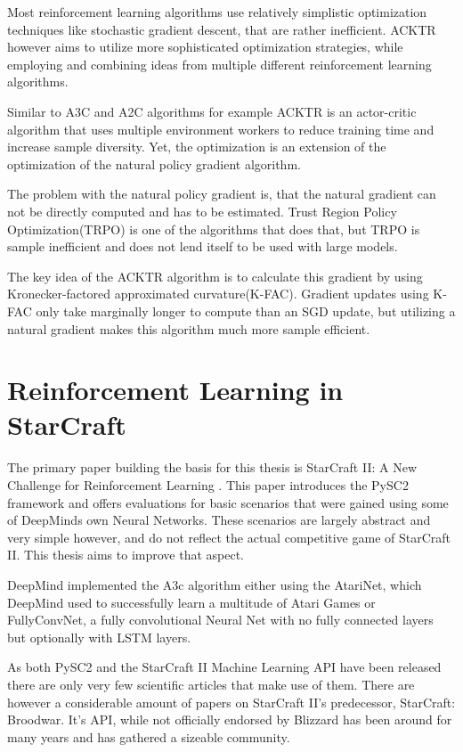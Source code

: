 Most reinforcement learning algorithms use relatively simplistic optimization techniques like stochastic gradient descent, that are rather inefficient. ACKTR however aims to utilize more sophisticated optimization strategies, while employing and combining ideas from multiple different reinforcement learning algorithms.

Similar to A3C and A2C algorithms for example ACKTR is an actor-critic algorithm that uses multiple environment workers to reduce training time and increase sample diversity. Yet, the optimization is an extension of the optimization of the natural policy gradient algorithm.

The problem with the natural policy gradient is, that the natural gradient can not be directly computed and has to be estimated. Trust Region Policy Optimization(TRPO) \citep{DBLP:journals/corr/SchulmanLMJA15} is one of the algorithms that does that, but TRPO is sample inefficient and does not lend itself to be used with large models.

The key idea of the ACKTR algorithm is to calculate this gradient by using Kronecker-factored approximated curvature(K-FAC)\citep{DBLP:journals/corr/MartensG15}.
Gradient updates using K-FAC only take marginally longer to compute than an SGD update, but utilizing a natural gradient makes this algorithm much more sample efficient.

\section{Reinforcement Learning in StarCraft}
The primary paper building the basis for this thesis is StarCraft II: A New Challenge for Reinforcement Learning \citep{DBLP:journals/corr/dmsc2}. This paper introduces the PySC2 framework and offers evaluations for basic scenarios that were gained using some of DeepMinds own Neural Networks. These scenarios are largely abstract and very simple however, and do not reflect the actual competitive game of StarCraft II. This thesis aims to improve that aspect.

DeepMind implemented the A3c algorithm either using the AtariNet, which DeepMind used to successfully learn a multitude of Atari Games or FullyConvNet, a fully convolutional Neural Net with no fully connected layers but optionally with LSTM layers. 

As both PySC2 and the StarCraft II Machine Learning API have been released there are only very few scientific articles that make use of them. There are however a considerable amount of papers on StarCraft II's predecessor, StarCraft: Broodwar. It's API, while not officially endorsed by Blizzard has been around for many years and has gathered a sizeable community.

